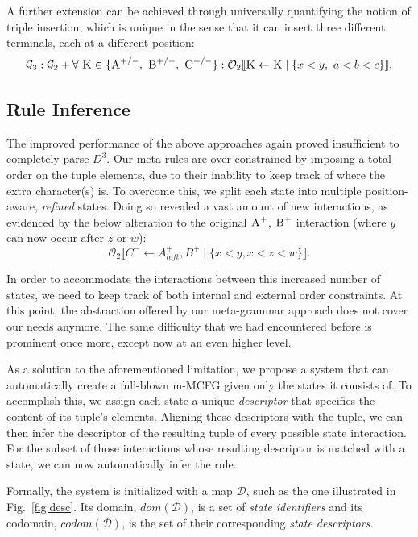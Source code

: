 \documentclass{llncs}
\newcommand\s{\textsc}
\newcommand{\Orderr}[5]{
	\mathcal{#1}_{#5}\llbracket #2 \leftarrow #3 \mid \{ #4 \} \rrbracket.
}
\newcommand{\Or}[4]{\Orderr{O}{#1}{#2}{#3}{#4}}
\begin{document}
A further extension can be achieved through universally quantifying the notion of triple insertion, which is unique in the sense that it can insert three different terminals, each at a different position:
\[
\mathcal{G}_3: \mathcal{G}_2 + \forall \ \s{K} \in \{\textsc{A}^{+/-},\ \textsc{B}^{+/-},\ \textsc{C}^{+/-}\}: \Or{\s{K}}{\s{K}}{x < y,\ a < b < c}{2}
\]

\subsection{Rule Inference}\label{aris}	
The improved performance of the above approaches again proved insufficient to completely parse $D^3$. Our meta-rules are over-constrained by imposing a total order on the tuple elements, due to their inability to keep track of where the extra character(s) is. To overcome this, we split each state into multiple position-aware, \textit{refined} states. Doing so revealed a vast amount of new interactions, as evidenced by the below alteration to the original $\s{A}^+$, $\s{B}^+$ interaction (where $y$ can now occur after $z$ or $w$):
\[
\Or{C^-}{A^+_{left}, B^+}{x < y, x < z < w}{2}
\]

In order to accommodate the interactions between this increased number of states, we need to keep track of both internal and external order constraints. At this point, the abstraction offered by our meta-grammar approach does not cover our needs anymore. The same difficulty that we had encountered before is prominent once more, except now at an even higher level. 

As a solution to the aforementioned limitation, we propose a system that can automatically create a full-blown m-MCFG given only the states it consists of. To accomplish this, we assign each state a unique \textit{descriptor} that specifies the content of its tuple's elements. Aligning these descriptors with the tuple, we can then infer the descriptor of the resulting tuple of every possible state interaction. For the subset of those interactions whose resulting descriptor is matched with a state, we can now automatically infer the rule.

Formally, the system is initialized with a map $\mathcal{D}$, such as the one illustrated in Fig.~\ref{fig:desc}. Its domain, $dom(\mathcal{D})$, is a set of \textit{state identifiers} and its codomain, $codom(\mathcal{D})$, is the set of their corresponding \textit{state descriptors}.
\end{document}
